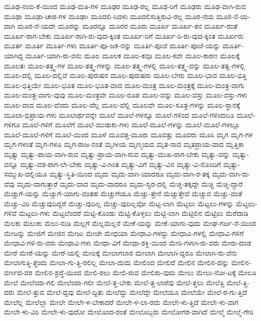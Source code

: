 {ಮೂಢ-ನಂಬಿ-ಕೆ-ಯಿಂದ
ಮೂಢ-ಮತಿ-ಗಳ
ಮೂಢರ
ಮೂಢ-ರಲ್ಲ
ಮೂಢ-ರಿಗೆ
ಮೂಢರು
ಮೂಢ-ವಾಗಿ-ರುವ
ಮೂಢಾ
ಮೂಢಾ-ಚಾರ-ಗಳ
ಮೂಢಾಃ
ಮೂದಲಿ-ಸಿದಳು
ಮೂದಲಿಸುತ್ತಿರುವಿ-ರಲ್ಲ
ಮೂರ-ನೆಯ
ಮೂರ-ನೆ-ಯ-ದಾಗಿ
ಮೂರ-ನೆ-ಯದೇ
ಮೂರನ್ನು
ಮೂರನ್ನೂ
ಮೂರರ
ಮೂರು
ಮೂರ್ಖ
ಮೂರ್ಖ-ತನ
ಮೂರ್ಖ-ರಂತೆ
ಮೂರ್ಖ-ರಾಗ-ಬೇಕು
ಮೂರ್ಖ-ರಾಗಿ-ರು-ವುದ-ಕ್ಕಿಂತ
ಮೂರ್ಖ-ರಿಗೆ
ಮೂರ್ಖ-ರಿ-ರು-ವುದ-ಕ್ಕಿಂತ
ಮೂರ್ಖರು
ಮೂರ್ತ
ಮೂರ್ತಿ
ಮೂರ್ತಿ-ಗಳು
ಮೂರ್ತಿ-ಪೂ-ಜಕ-ನನ್ನು
ಮೂರ್ತಿ-ಪೂಜೆ
ಮೂರ್ತಿ-ಪೂಜೆ-ಯನ್ನು
ಮೂರ್ತಿ-ಯಾಗಿದ್ದ
ಮೂರ್ತಿ-ಯಾಗಿ-ರು-ವನು
ಮೂಲ
ಮೂಲಕ
ಮೂಲ-ಕವೂ
ಮೂಲ-ಕವೇ
ಮೂಲ-ಕಾರಣ
ಮೂಲಕ್ಕೆ
ಮೂಲತಃ
ಮೂಲ-ತತ್ತ್ವ-ಗಳ
ಮೂಲ-ತತ್ತ್ವ-ಗಳನ್ನು
ಮೂಲ-ತತ್ತ್ವ-ಗಳಲ್ಲಿ
ಮೂಲ-ತತ್ತ್ವ-ವನ್ನು
ಮೂಲ-ತತ್ವ-ಗಳಲ್ಲಿ
ಮೂಲ-ದಲ್ಲಿ
ಮೂಲ-ದಲ್ಲಿವೆ
ಮೂಲ-ಪುರುಷನ
ಮೂಲ-ಪುರುಷರು
ಮೂಲ-ಬೇರು
ಮೂಲ-ಭಾವ
ಮೂಲ-ಭಿತ್ತಿ
ಮೂಲ-ಭಿತ್ತಿಯೇ
ಮೂಲ-ಭೂತ
ಮೂಲ-ಭೂತ-ವಾದ
ಮೂಲ-ಮಂತ್ರ
ಮೂಲ-ಮಂತ್ರಕ್ಕೆ
ಮೂಲ-ಮಂತ್ರ-ವಾಗು
ಮೂಲ-ಮಂತ್ರ-ವಾಗು-ವುವು
ಮೂಲ-ಮಂತ್ರವೇ
ಮೂಲ-ರೂಪ
ಮೂಲ-ವನ್ನು
ಮೂಲ-ವಸ್ತು
ಮೂಲ-ವಸ್ತು-ಗಳು
ಮೂಲ-ವಾದ
ಮೂಲ-ವೆಂದು
ಮೂಲ-ವೆಲ್ಲ
ಮೂಲ-ವೆಲ್ಲಿ
ಮೂಲವೇ
ಮೂಲ-ಸೂತ್ರ-ಗಳನ್ನು
ಮೂಲ-ಸ್ಥಾನಕ್ಕೆ
ಮೂಲಾ-ಭಿಪ್ರಾಯ-ಗಳು
ಮೂಲಾರ್ಥವನ್ನೇ
ಮೂಲೆ
ಮೂಲೆ-ಗಳನ್ನೂ
ಮೂಲೆ-ಗಳಿಂದ
ಮೂಲೆ-ಗಳಿಂದಲೂ
ಮೂಲೆ-ಗಳಿಗೂ
ಮೂಲೆ-ಗಳಿಗೆ
ಮೂಲೆಗೆ
ಮೂಲೆ-ಮುಡುಕು-ಗಳು
ಮೂಲೆ-ಮೂಲೆ-ಗಳನ್ನು
ಮೂಲೆ-ಮೂಲೆ-ಗಳಲ್ಲೂ
ಮೂಲೆ-ಮೂಲೆ-ಗಳಿಗೆ
ಮೂಲೆ-ಯಿಂದ
ಮೂಳೆ
ಮೂವತ್ತ-ಮೂರು
ಮೂವತ್ತು
ಮೂವರು
ಮೂಸಿ
ಮೃಗ
ಮೃಗ-ಗಳ
ಮೃಗ-ಗಳಂತೆ
ಮೃಗ-ಗಳೂ
ಮೃಗ-ರಾಜ-ನಂತೆ
ಮೃಗೀಯ
ಮೃಣ್ಮಯದ
ಮೃತ-ನಾದ
ಮೃತಪ್ರಾಯ-ವಾದ
ಮೃತ್ತಿಕಾ
ಮೃತ್ಯು
ಮೃತ್ಯು-ಪಾಯ-ವಾಗಿ-ರುವ
ಮೃತ್ಯು-ಪ್ರಾಯ-ವಾಗಿ-ರುವ
ಮೃತ್ಯು-ಮುಖ-ರಾಗ-ಬೇಕು
ಮೃತ್ಯು-ವನ್ನು
ಮೃತ್ಯು-ವನ್ನೂ
ಮೃತ್ಯು-ವಶ-ರಾಗ-ಲೇ-ಬೇಕು
ಮೃತ್ಯು-ವಿ-ಗಿಂತ
ಮೃತ್ಯು-ವಿಗೆ
ಮೃತ್ಯು-ವಿನ
ಮೃತ್ಯು-ವಿ-ನೊಂದಿಗೆ
ಮೃತ್ಯು-ಸಮ್ಮುಖ-ದಲ್ಲಿಯೂ
ಮೃತ್ಯು-ಸ್ಥಿತಿ-ಯಿಂದ
ಮೃದು
ಮೃದು-ವಾಗಿ-ಯಾದರೂ
ಮೃದು-ವಾಗಿ-ರ-ತಕ್ಕ
ಮೃದು-ವಾಗಿ-ರು-ವೆವು
ಮೃದು-ವಾಗುತ್ತಾರೆ
ಮೃದು-ವಾದ
ಮೃದು-ವಾದರೂ
ಮೃದು-ಸ್ವರ-ದಲ್ಲಿ
ಮೆಚ್ಚ-ತಕ್ಕದ್ದೇ
ಮೆಚ್ಚಿ
ಮೆಚ್ಚಿ-ದ್ದಾರೆ
ಮೆಚ್ಚುಗೆ-ಯನ್ನು
ಮೆಚ್ಚುಗೆ-ಯಾಗು-ವಂತಹ
ಮೆಚ್ಚುಗೆಯೂ
ಮೆಚ್ಚು-ತ್ತೇನೆ
ಮೆಚ್ಚುತ್ತೇವೆ
ಮೆಚ್ಚುವ
ಮೆಚ್ಚು-ವಂತೆ
ಮೆಚ್ಚು-ವಿರಿ
ಮೆಚ್ಚುವುದಿದ್ದರೆ
ಮೆಚ್ಚು-ವುದಿಲ್ಲ
ಮೆಚ್ಚು-ವುದಿಲ್ಲವೋ
ಮೆಟ್ಟ-ಲಾಗಿ
ಮೆಟ್ಟಲು
ಮೆಟ್ಟಲು-ಗಳನ್ನು
ಮೆಟ್ಟಲು-ಗಳಿವೆ
ಮೆಟ್ಟಲು-ಗಳು
ಮೆಟ್ಟಲೆಂದರೆ
ಮೆಟ್ಟಿ-ಕೊಂಡು
ಮೆಟ್ಟಿ-ಕೊಳ್ಳಲು
ಮೆಟ್ಟಿ-ಲಾಗಿ
ಮೆಟ್ಟಿಲಿನ
ಮೆಟ್ಟಿಲು
ಮೆರೆದಾಡಿ
ಮೆಲಕು
ಮೆಲುಕು
ಮೆಲು-ನುಡಿ
ಮೆಲ್ಲಗೆ
ಮೆಲ್ಲಮೆಲ್ಲನೆ
ಮೇಕೆ-ಯನ್ನು
ಮೇಕೆ-ಯಾಗು-ವುದು
ಮೇಘ-ಗರ್ಜ-ನೆ-ಯಿಂದ
ಮೇಜನ್ನು
ಮೇಜಿಗೆ
ಮೇಜಿನ
ಮೇಜು
ಮೇಜೇ
ಮೇಧಯಾ
ಮೇಧಾವಿ-ಗಳದ್ದು
ಮೇಧಾವಿ-ಗಳಲ್ಲಿ
ಮೇಧಾವಿ-ಗಳಿಗೆ
ಮೇಧಾವಿ-ಗಳಿ-ರು-ವರು
ಮೇಧಾವಿ-ಗಳು
ಮೇಧಾ-ವಿಗೆ
ಮೇಧಾ-ಶಕ್ತಿ-ಯಿಂದ
ಮೇರಿ-ಗಳಾಗಿ-ರು-ವರು
ಮೇರು-ದಂಡ
ಮೇರೆ
ಮೇರೆ-ಯನ್ನು
ಮೇರೆ-ಯಲ್ಲಿ
ಮೇಲಕ್ಕೆ
ಮೇಲಾಗಲಾರ
ಮೇಲಾಗಿ
ಮೇಲಾಗಿ-ದ್ದರೂ
ಮೇಲಾಗಿ-ರು-ವೆನು
ಮೇಲಾಗುತ್ತಿ-ತ್ತೆಂದು
ಮೇಲಾ-ಗು-ತ್ತಿ-ರಲಿಲ್ಲ
ಮೇಲಾ-ದುದು
ಮೇಲಿಂದ
ಮೇಲಿದೆ
ಮೇಲಿನ
ಮೇಲಿನ-ದನ್ನು
ಮೇಲಿನ-ವರ್ಣದ-ವರ
ಮೇಲಿನ-ಶ್ರದ್ಧೆ-ಯಿಂದ
ಮೇಲಿ-ರಲು
ಮೇಲಿ-ರುವ
ಮೇಲಿರು-ವುದು
ಮೇಲು
ಮೇಲು-ನೋ-ಟಕ್ಕೆ
ಮೇಲೂ
ಮೇಲೆ
ಮೇಲೆಂದಾ-ಗಲಿ
ಮೇಲೆಂದಾ-ಗಲೀ
ಮೇಲೆ-ತ್ತ-ಬೇಕು
ಮೇಲೆ-ತ್ತ-ಲಾರೆವು
ಮೇಲೆ-ತ್ತಲು
ಮೇಲೆತ್ತಿ
ಮೇಲೆ-ತ್ತಿ-ದರು
ಮೇಲೆ-ತ್ತುವ
ಮೇಲೆ-ದ್ದವು
ಮೇಲೆ-ದ್ದಿತು
ಮೇಲೆದ್ದು
ಮೇಲೆದ್ದೇ
ಮೇಲೆಯೂ
ಮೇಲೆಯೇ
ಮೇಲೆ-ರ-ಗು-ತ್ತಿದೆ
ಮೇಲೆಲ್ಲ
ಮೇಲೆಲ್ಲಾ
ಮೇಲೇ
ಮೇಲೇ-ಳ-ಬೇಕಾದರೆ
ಮೇಲೇ-ಳ-ಲಾ-ರದು
ಮೇಲೇ-ಳು-ತ್ತಿದೆ
ಮೇಲೇ-ಳು-ವಾಗ
ಮೇಲೇ-ಳು-ವಿರಿ
ಮೇಲೇ-ಳು-ವುದೋ
ಮೇಲೊಂದ-ರಂತೆ
ಮೇಲೊಬ್ಬರು
ಮೇಲೋಗರ-ವಾಗಿದೆ
ಮೇಲ್ಮೆ
ಮೇಲ್ಮೆ-ಗೇರಿ
}
